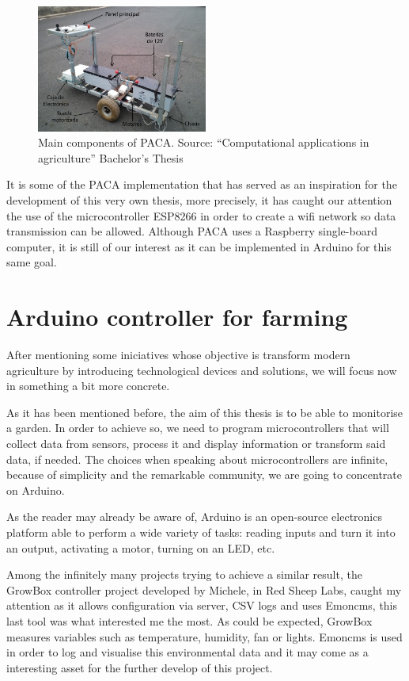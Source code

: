 \begin{figure}[htp]
    \centering
    \includegraphics[width=0.5\textwidth]{fig/paca.png}
    \caption{Main components of PACA. Source: ``Computational applications in agriculture'' Bachelor's Thesis}
    \label{fig:paca}
\end{figure}

 It is some of the PACA implementation that has served as an inspiration for the development of this very own thesis, more precisely, it has caught our attention the use of the microcontroller ESP8266 in order to create a wifi network so data transmission can be allowed. Although PACA uses a Raspberry single-board computer, it is still of our interest as it can be implemented in Arduino for this same goal.

\section{Arduino controller for farming}
After mentioning some iniciatives whose objective is transform modern agriculture by introducing technological devices and solutions, we will focus now in something a bit more concrete.

As it has been mentioned before, the aim of this thesis is to be able to monitorise a garden. In order to achieve so, we need to program microcontrollers that will collect data from sensors, process it and display information or transform said data, if needed. The choices when speaking about microcontrollers are infinite, because of simplicity and the remarkable community, we are going to concentrate on Arduino.

As the reader may already be aware of, Arduino is an open-source electronics platform able to perform a wide variety of tasks: reading inputs and turn it into an output, activating a motor, turning on an LED\cite{arduino}, etc.

Among the infinitely many projects trying to achieve a similar result, the GrowBox controller project developed by Michele, in Red Sheep Labs\cite{growbox}, caught my attention as it allows configuration via server, CSV logs and uses Emoncms, this last tool was what interested me the most. As could be expected, GrowBox measures variables such as temperature, humidity, fan or lights. Emoncms is used in order to log and visualise this environmental data and it may come as a interesting asset for the further develop of this project.

